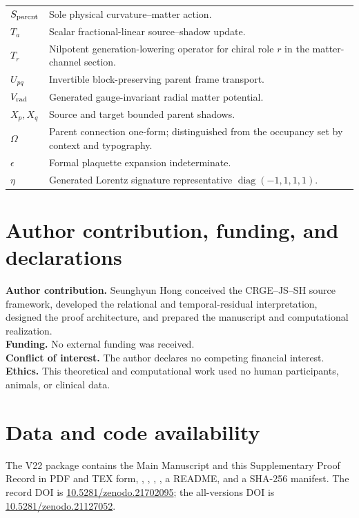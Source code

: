 \documentclass[11pt]{article}
\numberwithin{equation}{section}
\theoremstyle{remark}
\newcommand{\doi}[1]{\href{https://doi.org/#1}{#1}}
\begin{document}
\begin{longtable}{p{2.4cm}p{11.8cm}}
$S_{\rm parent}$&Sole physical curvature--matter action.\\
$T_a$&Scalar fractional-linear source--shadow update.\\
$T_r$&Nilpotent generation-lowering operator for chiral role $r$ in the matter-channel section.\\
$U_{pq}$&Invertible block-preserving parent frame transport.\\
$V_{\rm rad}$&Generated gauge-invariant radial matter potential.\\
$X_p,X_q$&Source and target bounded parent shadows.\\
$\Omega$&Parent connection one-form; distinguished from the occupancy set by context and typography.\\
$\epsilon$&Formal plaquette expansion indeterminate.\\
$\eta$&Generated Lorentz signature representative $\operatorname{diag}(-1,1,1,1)$.\\
\bottomrule
\end{longtable}

\section{Author contribution, funding, and declarations}
\textbf{Author contribution.} Seunghyun Hong conceived the CRGE--JS--SH source framework, developed the relational and temporal-residual interpretation, designed the proof architecture, and prepared the manuscript and computational realization.\\
\textbf{Funding.} No external funding was received.\\
\textbf{Conflict of interest.} The author declares no competing financial interest.\\
\textbf{Ethics.} This theoretical and computational work used no human participants, animals, or clinical data.

\section{Data and code availability}
The V22 package contains the Main Manuscript and this Supplementary Proof Record in PDF and TEX form, , , , , a README, and a SHA-256 manifest. The record DOI is \doi{10.5281/zenodo.21702095}; the all-versions DOI is \doi{10.5281/zenodo.21127052}.
\end{document}
